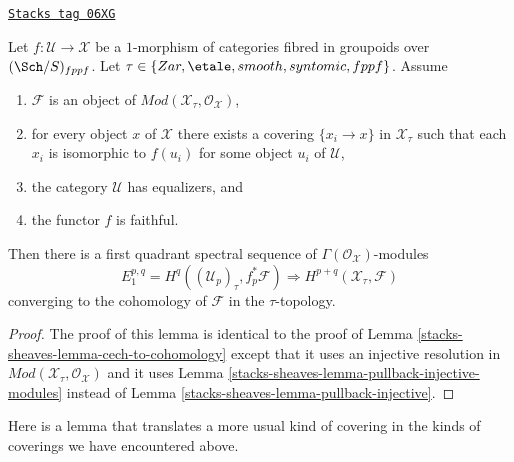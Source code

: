 \begin{lemma}
\label{stacks-sheaves-lemma-cech-to-cohomology-modules}
\href{https://stacks.math.columbia.edu/tag/06XG}{\texttt{Stacks tag 06XG}}

Let $f : \mathcal{U} \to \mathcal{X}$ be a $1$-morphism of categories fibred
in groupoids over $(\Sch/S)_{fppf}$. Let
$\tau \in \{Zar, \etale, smooth, syntomic, fppf\}$.
Assume
\begin{enumerate}
\item $\mathcal{F}$ is an object of
$\textit{Mod}(\mathcal{X}_\tau, \mathcal{O}_\mathcal{X})$,
\item for every object $x$ of $\mathcal{X}$ there exists a covering
$\{x_i \to x\}$ in $\mathcal{X}_\tau$ such that each $x_i$ is isomorphic
to $f(u_i)$ for some object $u_i$ of $\mathcal{U}$,
\item the category $\mathcal{U}$ has equalizers, and
\item the functor $f$ is faithful.
\end{enumerate}
Then there is a first quadrant spectral sequence of
$\Gamma(\mathcal{O}_\mathcal{X})$-modules
$$
E_1^{p, q} = H^q((\mathcal{U}_p)_\tau, f_p^*\mathcal{F})
\Rightarrow
H^{p + q}(\mathcal{X}_\tau, \mathcal{F})
$$
converging to the cohomology of $\mathcal{F}$ in the $\tau$-topology.
\end{lemma}

\begin{proof}
The proof of this lemma is identical to the proof of
Lemma \ref{stacks-sheaves-lemma-cech-to-cohomology}
except that it uses an injective resolution in
$\textit{Mod}(\mathcal{X}_\tau, \mathcal{O}_\mathcal{X})$
and it uses
Lemma \ref{stacks-sheaves-lemma-pullback-injective-modules}
instead of
Lemma \ref{stacks-sheaves-lemma-pullback-injective}.
\end{proof}

Here is a lemma that translates a more usual kind of covering in the
kinds of coverings we have encountered above.

